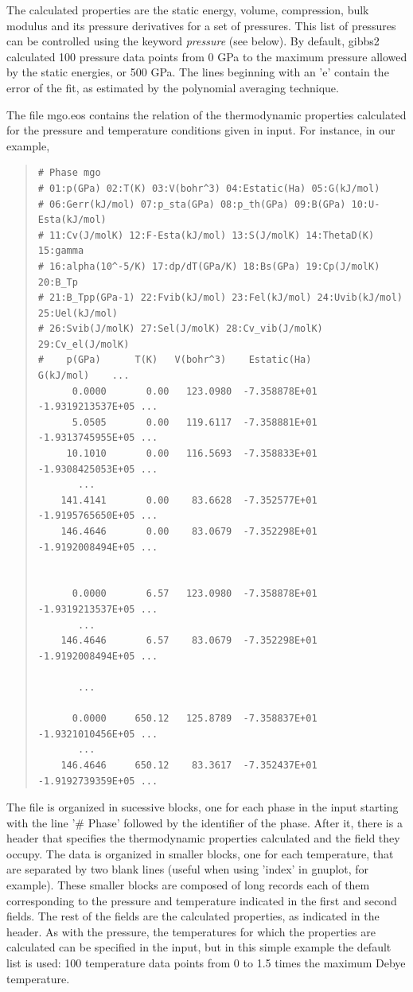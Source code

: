 \documentclass[a4paper]{article}
\begin{document}
The calculated properties are the static energy, volume, compression,
bulk modulus and its pressure derivatives for a set of pressures. This
list of pressures can be controlled using the keyword \emph{pressure} (see
below). By default, gibbs2 calculated 100 pressure data points from 0
GPa to the maximum pressure allowed by the static energies, or 500
GPa. The lines beginning with an 'e' contain the error of the fit, as
estimated by the polynomial averaging technique.

The file mgo.eos contains the relation of the thermodynamic properties
calculated for the pressure and temperature conditions given in
input. For instance, in our example,
%
\begin{quote}
\begin{verbatim}
# Phase mgo
# 01:p(GPa) 02:T(K) 03:V(bohr^3) 04:Estatic(Ha) 05:G(kJ/mol)
# 06:Gerr(kJ/mol) 07:p_sta(GPa) 08:p_th(GPa) 09:B(GPa) 10:U-Esta(kJ/mol)
# 11:Cv(J/molK) 12:F-Esta(kJ/mol) 13:S(J/molK) 14:ThetaD(K) 15:gamma
# 16:alpha(10^-5/K) 17:dp/dT(GPa/K) 18:Bs(GPa) 19:Cp(J/molK) 20:B_Tp
# 21:B_Tpp(GPa-1) 22:Fvib(kJ/mol) 23:Fel(kJ/mol) 24:Uvib(kJ/mol) 25:Uel(kJ/mol)
# 26:Svib(J/molK) 27:Sel(J/molK) 28:Cv_vib(J/molK) 29:Cv_el(J/molK)
#    p(GPa)      T(K)   V(bohr^3)    Estatic(Ha)        G(kJ/mol)    ...
      0.0000       0.00   123.0980  -7.358878E+01  -1.9319213537E+05 ...
      5.0505       0.00   119.6117  -7.358881E+01  -1.9313745955E+05 ...
     10.1010       0.00   116.5693  -7.358833E+01  -1.9308425053E+05 ...
       ...
    141.4141       0.00    83.6628  -7.352577E+01  -1.9195765650E+05 ...
    146.4646       0.00    83.0679  -7.352298E+01  -1.9192008494E+05 ...


      0.0000       6.57   123.0980  -7.358878E+01  -1.9319213537E+05 ...
       ...
    146.4646       6.57    83.0679  -7.352298E+01  -1.9192008494E+05 ...

       ...

      0.0000     650.12   125.8789  -7.358837E+01  -1.9321010456E+05 ...
       ...
    146.4646     650.12    83.3617  -7.352437E+01  -1.9192739359E+05 ...
\end{verbatim}
\end{quote}

The file is organized in sucessive blocks, one for each phase in the
input starting with the line '\# Phase' followed by the identifier of
the phase. After it, there is a header that specifies the
thermodynamic properties calculated and the field they occupy. The
data is organized in smaller blocks, one for each temperature, that
are separated by two blank lines (useful when using 'index' in
gnuplot, for example). These smaller blocks are composed of long
records each of them corresponding to the pressure and temperature
indicated in the first and second fields. The rest of the fields are
the calculated properties, as indicated in the header. As with the
pressure, the temperatures for which the properties are calculated can
be specified in the input, but in this simple example the default
list is used: 100 temperature data points from 0 to 1.5 times the
maximum Debye temperature.
\end{document}

